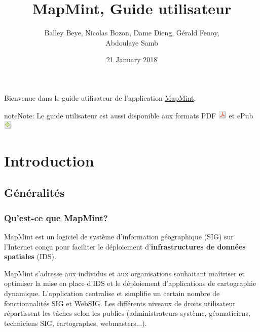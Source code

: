 \documentclass[letterpaper,10pt,french]{sphinxmanual}
\title{MapMint, Guide utilisateur}
\date{21 January 2018}
\author{Balley Beye, Nicolas Bozon, Dame Dieng, Gérald Fenoy, \\Abdoulaye Samb}
\begin{document}
\maketitle
\tableofcontents
{}\label{index::doc}


Bienvenue dans le guide utilisateur de l'application \href{http://mapmint.com}{MapMint}.

\begin{notice}{note}{Note:}
Le guide utilisateur est aussi disponible aux formats
PDF \includegraphics{pdf.png}  et ePub \includegraphics{epub.png}
\end{notice}


\chapter{Introduction}
\label{introduction/index:table-des-matieres}\label{introduction/index:home}\label{introduction/index::doc}\label{introduction/index:dashboard}\label{introduction/index:introduction}

\section{Généralités}
\label{introduction/introduction:generalites}\label{introduction/introduction::doc}\label{introduction/introduction:userguidegeneral}

\subsection{Qu’est-ce que MapMint?}
\label{introduction/introduction:quest-ce-que-mapmint}
MapMint est un logiciel de système d'information géographique (SIG) sur l'Internet  conçu pour faciliter le déploiement d'\textbf{infrastructures de données spatiales} (IDS).

MapMint s'adresse aux individus et aux organisations souhaitant maîtriser et optimiser la mise en place d'IDS et le déploiement d'applications de cartographie dynamique. L'application centralise et simplifie un certain nombre de fonctionnalités SIG et WebSIG. Les différents niveaux de droits utilisateur répartissent les tâches selon les publics (administrateurs système, géomaticiens, techniciens SIG, cartographes, webmasters...).
\end{document}
